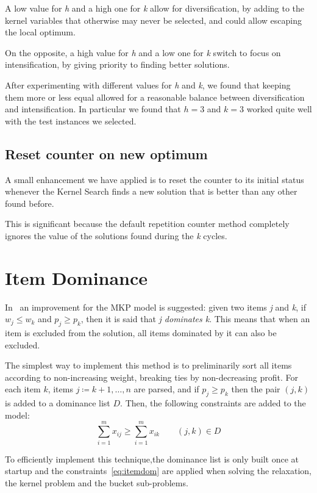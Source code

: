 A low value for \textit{h} and a high one for \textit{k} allow for
diversification, by adding to the kernel variables that otherwise
may never be selected, and could allow escaping the local optimum.

On the opposite, a high value for \textit{h} and a low one for \textit{k}
switch to focus on intensification, by giving priority to finding
better solutions.

After experimenting with different values for \textit{h} and \textit{k},
we found that keeping them more or less equal allowed for
a reasonable balance between diversification and intensification.
In particular we found that \(h=3\) and \(k=3\) worked quite well
with the test instances we selected.

\subsection{Reset counter on new optimum}
A small enhancement we have applied is to reset the counter to its initial status
whenever the Kernel Search finds a new solution
that is better than any other found before.

This is significant because the default repetition counter
method completely ignores the value of the solutions found
during the \textit{k} cycles.


\section{Item Dominance}
In~\cite{mkp:2019} an improvement for the MKP model is suggested:
given two items \textit{j} and \textit{k}, if \(w_{j} \leq w_{k}\)
and \(p_{j} \geq p_{k}\), then it is said that \textit{j dominates k}.
This means that when an item is excluded from the solution,
all items dominated by it can also be excluded.

The simplest way to implement this method is to preliminarily sort all
items according to non-increasing weight, breaking ties by
non-decreasing profit.
For each item \(k\), items \(j \coloneqq k+1,\dots,n\) are parsed,
and if \(p_{j} \geq p_{k}\) then the pair \((j,k)\) is added to a
dominance list \(D\).
Then, the following constraints are added to the model:
\begin{equation}
    \label{eq:itemdom}
    \sum_{i=1}^{m} x_{ij} \geq \sum_{i=1}^{m} x_{ik} \qquad (j,k) \in D
\end{equation}

To efficiently implement this technique,the dominance list is only built once at startup
and the constraints~\eqref{eq:itemdom} are applied when solving
the relaxation, the kernel problem and the bucket sub-problems.

